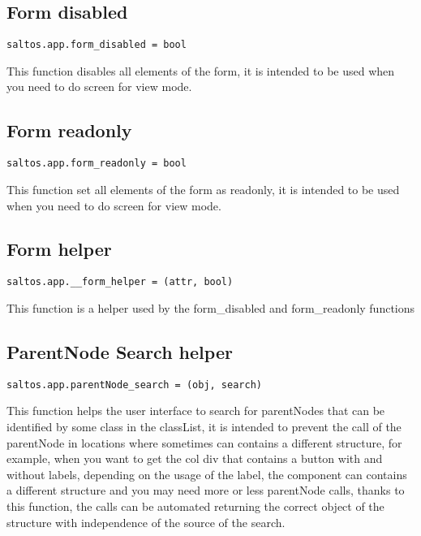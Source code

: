 \documentclass[a4paper]{book}
\begin{document}
\subsection{Form disabled}

\begin{lstlisting}
saltos.app.form_disabled = bool
\end{lstlisting}

This function disables all elements of the form, it is intended to be used when you need
to do screen for view mode.

\hypertarget{toc422}{}
\subsection{Form readonly}

\begin{lstlisting}
saltos.app.form_readonly = bool
\end{lstlisting}

This function set all elements of the form as readonly, it is intended to be used when you need
to do screen for view mode.

\hypertarget{toc423}{}
\subsection{Form helper}

\begin{lstlisting}
saltos.app.__form_helper = (attr, bool)
\end{lstlisting}

This function is a helper used by the form\_disabled and form\_readonly functions

\hypertarget{toc424}{}
\subsection{ParentNode Search helper}

\begin{lstlisting}
saltos.app.parentNode_search = (obj, search)
\end{lstlisting}

This function helps the user interface to search for parentNodes that can be identified
by some class in the classList, it is intended to prevent the call of the parentNode in
locations where sometimes can contains a different structure, for example, when you want
to get the col div that contains a button with and without labels, depending on the
usage of the label, the component can contains a different structure and you may need
more or less parentNode calls, thanks to this function, the calls can be automated
returning the correct object of the structure with independence of the source of the
search.
\end{document}
